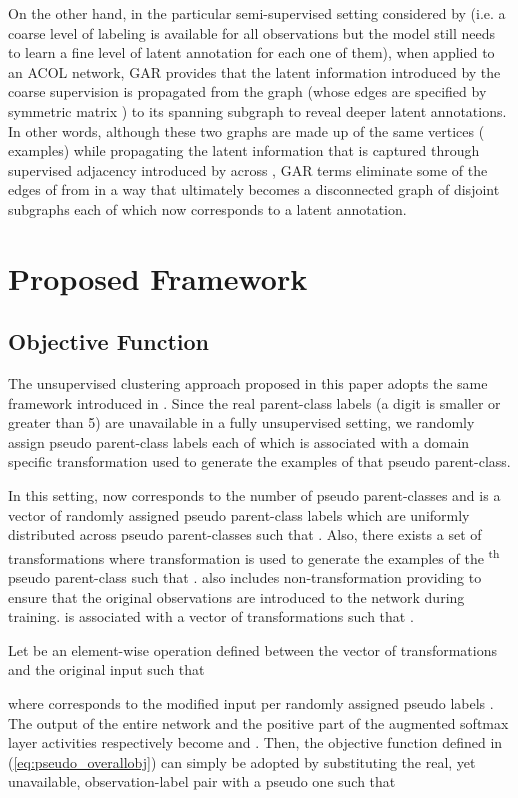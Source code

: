 \documentclass{article} \usepackage{iclr2018_conference,times}
\begin{document}
On the other hand, in the particular semi-supervised setting considered by \citet{KilincU17ACOL} (i.e. a coarse level of labeling is available for all observations but the model still needs to learn a fine level of latent annotation for each one of them), when applied to an ACOL network, GAR provides that the latent information introduced by the coarse supervision is propagated from the graph  (whose edges are specified by  symmetric matrix ) to its spanning subgraph  to reveal deeper latent annotations. In other words, although these two graphs are made up of the same vertices ( examples) while propagating the latent information that is captured through supervised adjacency introduced by 
across , GAR terms eliminate some of the edges of  from  in a way that  ultimately becomes a disconnected graph of  disjoint subgraphs each of which now corresponds to a latent annotation.

\section{Proposed Framework}
\subsection{Objective Function}

The unsupervised clustering approach proposed in this paper adopts the same framework introduced in \citet{KilincU17ACOL}. Since the real parent-class labels (a digit is smaller or greater than 5) are unavailable in a fully unsupervised setting, we randomly assign pseudo parent-class labels each of which is associated with a domain specific transformation used to generate the examples of that pseudo parent-class.

In this setting,  now corresponds to the number of pseudo parent-classes and  is a vector of randomly assigned pseudo parent-class labels which are uniformly distributed across  pseudo parent-classes such that . Also, there exists a set of transformations  where transformation  is used to generate the examples of the \textsuperscript{th} pseudo parent-class such that .  also includes non-transformation  providing  to ensure that the original observations are introduced to the network during training.  is associated with a vector of transformations  such that . 

Let  be an element-wise operation defined between the vector of transformations  and the original input  such that

where  corresponds to the modified input per randomly assigned pseudo labels . The output of the entire network and the positive part of the augmented softmax layer activities respectively become  and . Then, the objective function defined in (\ref{eq:pseudo_overallobj}) can simply be adopted by substituting the real, yet unavailable, observation-label pair  with a pseudo one  such that 
\end{document}
